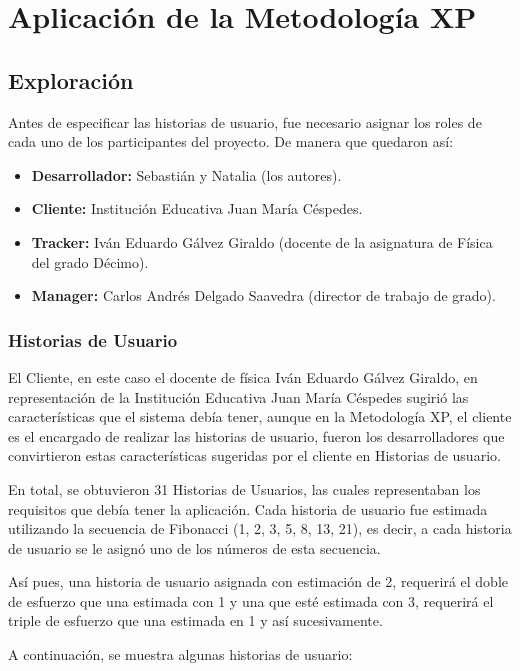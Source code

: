 \section{Aplicación de la Metodología XP}
\subsection{Exploración}
Antes de especificar las historias de usuario, fue necesario asignar los roles de cada uno de los participantes del proyecto. De manera que quedaron así: 

\begin{itemize}
    \item \textbf{Desarrollador:} Sebastián y Natalia (los autores).
    \item \textbf{Cliente: } Institución Educativa Juan María Céspedes.
    \item \textbf{Tracker: } Iván Eduardo Gálvez Giraldo (docente de la asignatura de Física del grado Décimo).
    \item \textbf{Manager: }Carlos Andrés Delgado Saavedra (director de trabajo de grado).
\end{itemize}

\subsubsection{Historias de Usuario}
El Cliente, en este caso el docente de física Iván Eduardo Gálvez Giraldo, en representación de la Institución Educativa Juan María Céspedes sugirió las características que el sistema debía tener, aunque en la Metodología XP, el cliente es el encargado de realizar las historias de usuario, fueron los desarrolladores que convirtieron estas características sugeridas por el cliente en Historias de usuario. 

En total, se obtuvieron 31 Historias de Usuarios, las cuales representaban los requisitos que debía tener la aplicación. Cada historia de usuario fue estimada utilizando la secuencia de Fibonacci (1, 2, 3, 5, 8, 13, 21), es decir, a cada historia de usuario se le asignó uno de los números de esta secuencia.

Así pues, una historia de usuario asignada con estimación de 2, requerirá el doble de esfuerzo que una estimada con 1 y una que esté estimada con 3, requerirá el triple de esfuerzo que una estimada en 1 y así sucesivamente.

A continuación, se muestra algunas historias de usuario:

